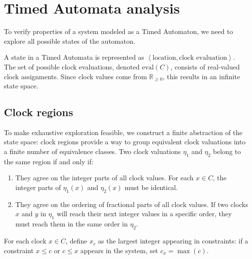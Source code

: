 \section{Timed Automata analysis}

To verify properties of a system modeled as a Timed Automaton, we need to explore all possible states of the automaton.

A state in a Timed Automata is represented as $\left\langle \text{location},\text{clock evaluation}\right\rangle$.
The set of possible clock evaluations, denoted $\text{eval}(C)$, consists of real-valued clock assignments.
Since clock values come from $\mathbb{R}_{\geq 0}$, this results in an infinite state space.

\subsection{Clock regions}
To make exhaustive exploration feasible, we construct a finite abstraction of the state space: clock regions provide a way to group equivalent clock valuations into a finite number of equivalence classes.
Two clock valuations $\eta_1$ and $\eta_2$ belong to the same region if and only if:
\begin{enumerate}
    \item They agree on the integer parts of all clock values.
        For each  $x\in C$, the integer parts of $\eta_1(x)$ and $\eta_2(x)$ must be identical.
    \item They agree on the ordering of fractional parts of all clock values.
        If two clocks $x$ and $y$ in $\eta_1$ will reach their next integer values in a specific order, they must reach them in the same order in $\eta_2$.
\end{enumerate}
\noindent For each clock $x\in C$, define $x_c$ as the largest integer appearing in constraints: if a constraint $x \leq c$ or $c\leq x$ appears in the system, set $c_x=\max(c)$.

